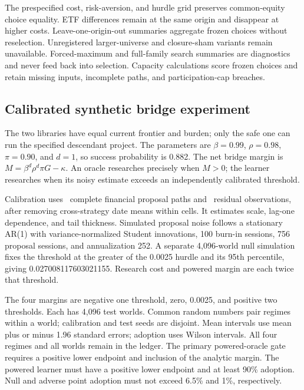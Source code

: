 The prespecified cost, risk-aversion, and hurdle grid preserves common-equity
choice equality. ETF differences remain at the same origin and disappear at
higher costs. Leave-one-origin-out summaries aggregate frozen choices without
reselection. Unregistered larger-universe and closure-sham variants remain
unavailable. Forced-maximum and full-family search summaries are diagnostics
and never feed back into selection. Capacity calculations score frozen choices
and retain missing inputs, incomplete paths, and participation-cap breaches.

\subsection{Calibrated synthetic bridge experiment}

The two libraries have equal current frontier and burden; only the safe one
can run the specified descendant project. The parameters are
\(\beta=0.99\), \(\rho=0.98\), \(\pi=0.90\), and \(d=1\), so success
probability is 0.882. The net bridge margin is
\(M=\beta^d\rho^d\pi G-\kappa\). An oracle researches precisely when
\(M>0\); the learner researches when its noisy estimate exceeds an
independently calibrated threshold.

Calibration uses \AORPointInTimeCompletePaths\ complete financial proposal
paths and \AORPointInTimeResidualObservations\ residual observations, after
removing cross-strategy date means within cells. It estimates scale, lag-one
dependence, and tail thickness. Simulated proposal noise follows a stationary
AR(1) with variance-normalized Student innovations, 100 burn-in sessions,
756 proposal sessions, and annualization 252. A separate 4,096-world null
simulation fixes the threshold at the greater of the 0.0025 hurdle and its
95th percentile, giving 0.027008117603021155. Research cost and powered margin
are each twice that threshold.

The four margins are negative one threshold, zero, 0.0025, and positive two
thresholds. Each has 4,096 test worlds. Common random numbers pair regimes
within a world; calibration and test seeds are disjoint. Mean intervals use
mean plus or minus 1.96 standard errors; adoption uses Wilson intervals.
All four regimes and all worlds remain in the ledger. The primary
powered-oracle gate requires a positive lower endpoint and inclusion of the
analytic margin. The powered learner must have a positive lower endpoint and
at least 90\% adoption. Null and adverse point adoption must not exceed
6.5\% and 1\%, respectively.

